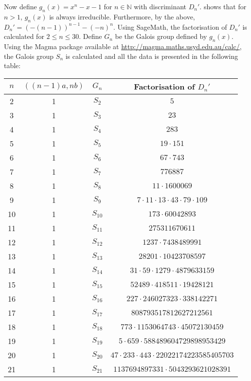 \documentclass[12pt]{extarticle}
\newcommand{\<}{\langle}
\renewcommand{\>}{\rangle}
\theoremstyle{definition}
\begin{document}
Now define $g_n(x) = x^n-x-1$ for $ n \in \mathbb{N}$ with discriminant $D_n'$. \cite{SELMER} shows that for $n>1$, $g_n(x)$ is always irreducible. Furthermore, by the above, $D_n'= (-(n-1))^{n-1} - (-n)^{n}$. 
Using SageMath, the factorisation of $D_n'$ is calculated for $2 \leq n \leq 30$. Define $G_n$ be the Galois group defined by $g_n(x)$. Using the Magma package available at \url{http://magma.maths.usyd.edu.au/calc/}, the Galois group $S_n$ is calculated and all the data is presented in the following table:
\begin{center}
 \begin{tabular}{||c | c | c | c||} 
 \hline
 $n$ & $((n-1)a,nb)$ & $G_n$ & Factorisation of $D_n'$ \\ [0.5ex] 
 \hline\hline
2 & 1 & $S_{2}$ & $5$ \\
\hline
3 & 1 & $S_{3}$ & $23$ \\
\hline
4 & 1 & $S_{4}$ & $283$ \\
\hline
5 & 1 & $S_{5}$ & $19 \cdot 151$ \\
\hline
6 & 1 & $S_{6}$ & $67 \cdot 743$ \\
\hline
7 & 1 & $S_{7}$ & $776887$ \\
\hline
8 & 1 & $S_{8}$ & $11 \cdot 1600069$ \\
\hline
9 & 1 & $S_{9}$ & $7 \cdot 11 \cdot 13 \cdot 43 \cdot 79 \cdot 109$ \\
\hline
10 & 1 & $S_{10}$ & $173 \cdot 60042893$ \\
\hline
11 & 1 & $S_{11}$ & $275311670611$ \\
\hline
12 & 1 & $S_{12}$ & $1237 \cdot 7438489991$ \\
\hline
13 & 1 & $S_{13}$ & $28201 \cdot 10423708597$ \\
\hline
14 & 1 & $S_{14}$ & $31 \cdot 59 \cdot 1279 \cdot 4879633159$ \\
\hline
15 & 1 & $S_{15}$ & $52489 \cdot 418511 \cdot 19428121$ \\
\hline
16 & 1 & $S_{16}$ & $227 \cdot 246027323 \cdot 338142271$ \\
\hline
17 & 1 & $S_{17}$ & $808793517812627212561$ \\
\hline
18 & 1 & $S_{18}$ & $773 \cdot 1153064743 \cdot 45072130459$ \\
\hline
19 & 1 & $S_{19}$ & $5 \cdot 659 \cdot 588489604729898953429$ \\
\hline
20 & 1 & $S_{20}$ & $47 \cdot 233 \cdot 443 \cdot 22022174223585405703$ \\
\hline
21 & 1 & $S_{21}$ & $1137694897331 \cdot 5043293621028391$ \\

\end{tabular}
\end{center}
\end{document}
